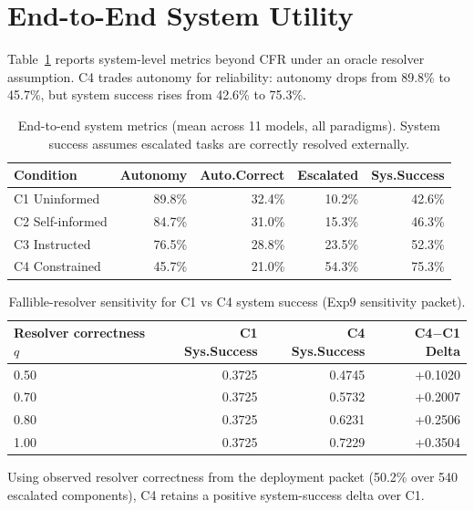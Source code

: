 \documentclass[10pt]{article}
\begin{document}
\section{End-to-End System Utility}
\label{app:e2e}

Table~\ref{tab:e2e} reports system-level metrics beyond CFR under an oracle
resolver assumption. C4 trades autonomy for reliability: autonomy drops from
89.8\% to 45.7\%, but system success rises from 42.6\% to 75.3\%.

\begin{table}[h]
\centering
\caption{End-to-end system metrics (mean across 11 models, all paradigms). System success assumes escalated tasks are correctly resolved externally.}
\label{tab:e2e}
\small
\begin{tabular}{lrrrr}
\toprule
Condition & Autonomy & Auto.Correct & Escalated & Sys.Success \\
\midrule
C1 Uninformed & 89.8\% & 32.4\% & 10.2\% & 42.6\% \\
C2 Self-informed & 84.7\% & 31.0\% & 15.3\% & 46.3\% \\
C3 Instructed & 76.5\% & 28.8\% & 23.5\% & 52.3\% \\
C4 Constrained & 45.7\% & 21.0\% & 54.3\% & 75.3\% \\
\bottomrule
\end{tabular}
\end{table}

\begin{table}[h]
\centering
\caption{Fallible-resolver sensitivity for C1 vs C4 system success (Exp9 sensitivity packet).}
\label{tab:e2e-fallible}
\small
\begin{tabular}{lrrr}
\toprule
Resolver correctness $q$ & C1 Sys.Success & C4 Sys.Success & C4$-$C1 Delta \\
\midrule
0.50 & 0.3725 & 0.4745 & +0.1020 \\
0.70 & 0.3725 & 0.5732 & +0.2007 \\
0.80 & 0.3725 & 0.6231 & +0.2506 \\
1.00 & 0.3725 & 0.7229 & +0.3504 \\
\bottomrule
\end{tabular}
\end{table}

Using observed resolver correctness from the deployment packet (50.2\% over 540
escalated components), C4 retains a positive system-success delta over C1.
\end{document}
